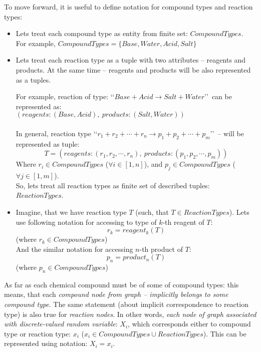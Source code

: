 \documentclass[10pt]{article}
\begin{document}
\noindent To move forward, it is useful to define notation for compound types and reaction types:
\begin{itemize}

    \item Lets treat each compound type as entity from finite set: $CompoundTypes$. \\
    For example, $CompoundTypes = \{Base, Water, Acid, Salt\}$

    \item Lets treat each reaction type as a tuple with two attributes -- reagents and products. At the same time -- reagents and products will be also represented as a tuples. 

For example, reaction of type: \lq \lq$Base + Acid \rightarrow Salt + Water$\rq \rq \ can be represented as: \\
$(reagents: (Base, Acid),\ products: (Salt, Water))$ \\ \\
In general, reaction type \lq \lq$r_1 + r_2 + \cdots + r_n \rightarrow p_1 + p_2 + \cdots + p_m$\rq \rq \ -- will be represented as tuple:
\begin{equation} \label{eq:reaction_type_notation}
T = (reagents:(r_1, r_2, \cdots , r_n),\ products:(p_1, p_2, \cdots , p_m))
\end{equation}
Where $r_i \in CompoundTypes$ ($\forall i \in [1, n]$), and $p_j \in CompoundTypes$ ($\forall j \in [1, m]$). \\
So, lets treat all reaction types as finite set of described tuples: $ReactionTypes$.

    \item Imagine, that we have reaction type $T$ (such, that $T \in ReactionTypes$). Lets use following notation for accessing to type of $k$-th reagent of $T$:
\begin{equation} \label{eq:access_reagent_type_notation}
r_k = reagent_k(T)
\end{equation}   
(where $r_k \in CompoundTypes$) \\

And the similar notation for accessing $n$-th product of $T$:
\begin{equation} \label{eq:access_product_type_notation}
p_n = product_n(T)
\end{equation}   
(where $p_n \in CompoundTypes$)

\end{itemize}

\noindent As far as each chemical compound must be of some of compound types: this means, that each \emph{compound node from graph -- implicitly belongs to some compound type}. The same statement (about implicit correspondence to reaction type) is also true for \emph{reaction nodes}. In other words, \emph{each node of graph associated with discrete-valued random variable}: $X_i$, which corresponds either to compound type or reaction type: $x_i$ ($x_i \in CompoundTypes \cup ReactionTypes$). This can be represented using notation: $X_i = x_i$. 
\end{document}
